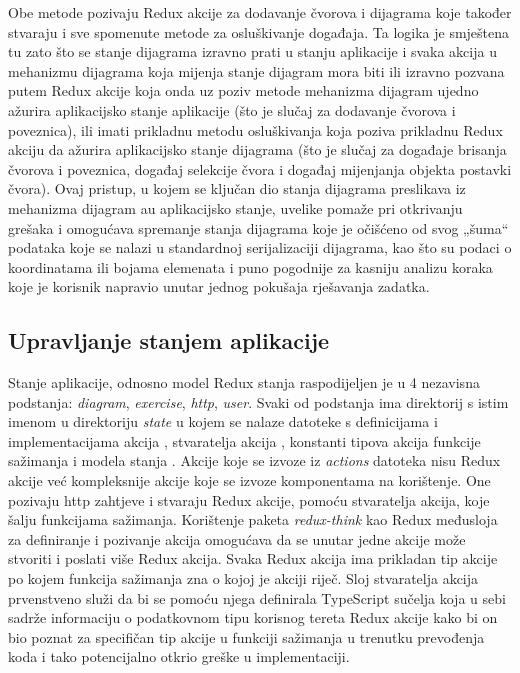 \documentclass[times, utf8, diplomski, numeric]{fer}
\newcommand{\razmaks}{\vspace{10pt}}
\begin{document}
Obe metode pozivaju Redux akcije za dodavanje čvorova i dijagrama koje također stvaraju i sve spomenute metode za osluškivanje događaja.
Ta logika je smještena tu zato što se stanje dijagrama izravno prati u stanju aplikacije i svaka akcija u mehanizmu dijagrama koja mijenja stanje dijagram mora biti ili izravno pozvana putem Redux akcije koja onda uz poziv metode mehanizma dijagram ujedno ažurira aplikacijsko stanje aplikacije (što je slučaj za dodavanje čvorova i poveznica), ili imati prikladnu metodu osluškivanja koja poziva prikladnu Redux akciju da ažurira aplikacijsko stanje dijagrama (što je slučaj za događaje brisanja čvorova i poveznica, događaj selekcije čvora i događaj mijenjanja objekta postavki čvora).
Ovaj pristup, u kojem se ključan dio stanja dijagrama preslikava iz mehanizma dijagram au aplikacijsko stanje, uvelike pomaže pri otkrivanju grešaka i omogućava spremanje stanja dijagrama koje je očišćeno od svog „šuma“ podataka koje se nalazi u standardnoj serijalizaciji dijagrama, kao što su podaci o koordinatama ili bojama elemenata i puno pogodnije za kasniju analizu koraka koje je korisnik napravio unutar jednog pokušaja rješavanja zadatka.

\razmaks
\subsection{Upravljanje stanjem aplikacije}

Stanje aplikacije, odnosno model Redux stanja raspodijeljen je u 4 nezavisna podstanja: \emph{diagram}, \emph{exercise}, \emph{http}, \emph{user}.
Svaki od podstanja ima direktorij s istim imenom u direktoriju \emph{state} u kojem se nalaze datoteke s definicijama i implementacijama akcija , stvaratelja akcija , konstanti tipova akcija  funkcije sažimanja  i modela stanja .
Akcije koje se izvoze iz \emph{actions} datoteka nisu Redux akcije već kompleksnije akcije koje se izvoze komponentama na korištenje.
One pozivaju http zahtjeve i stvaraju Redux akcije, pomoću stvaratelja akcija, koje šalju  funkcijama sažimanja.
Korištenje paketa \emph{redux-think} kao Redux međusloja za definiranje i pozivanje akcija omogućava da se unutar jedne akcije može stvoriti i poslati više Redux akcija.
Svaka Redux akcija ima prikladan tip akcije po kojem funkcija sažimanja zna o kojoj je akciji riječ.
Sloj stvaratelja akcija prvenstveno služi da bi se pomoću njega definirala TypeScript sučelja koja u sebi sadrže informaciju o podatkovnom tipu korisnog tereta  Redux akcije kako bi on bio poznat za specifičan tip akcije u funkciji sažimanja u trenutku prevođenja koda i tako potencijalno otkrio greške u implementaciji.
\end{document}
